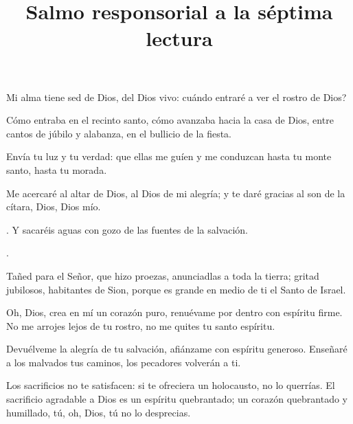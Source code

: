
 


\begin{psbody}
Mi alma tiene sed de Dios, del Dios vivo: 
cuándo entraré a ver el rostro de Dios? 

Cómo entraba en el recinto santo, 
cómo avanzaba hacia la casa de Dios, 
entre cantos de júbilo y alabanza, 
en el bullicio de la fiesta. 

Envía tu luz y tu verdad: 
que ellas me guíen 
y me conduzcan hasta tu monte santo, 
hasta tu morada. 

Me acercaré al altar de Dios, 
al Dios de mi alegría; 
y te daré gracias al son de la cítara, 
Dios, Dios mío. 
\end{psbody}

\newpage 





\begin{psbody}
.
Y sacaréis aguas con gozo
de las fuentes de la salvación. 

. 

Tañed para el Señor, que hizo proezas,
anunciadlas a toda la tierra;
gritad jubilosos, habitantes de Sion,
porque es grande en medio de ti el Santo de Israel. 
\end{psbody}

\title{Salmo responsorial a la séptima lectura}




\begin{psbody}
Oh, Dios, crea en mí un corazón puro, 
renuévame por dentro con espíritu firme. 
No me arrojes lejos de tu rostro, 
no me quites tu santo espíritu. 

Devuélveme la alegría de tu salvación, 
afiánzame con espíritu generoso. 
Enseñaré a los malvados tus caminos, 
los pecadores volverán a ti. 

Los sacrificios no te satisfacen: 
si te ofreciera un holocausto, no lo querrías. 
El sacrificio agradable a Dios 
es un espíritu quebrantado; 
un corazón quebrantado y humillado, 
tú, oh, Dios, tú no lo desprecias. 
\end{psbody}

